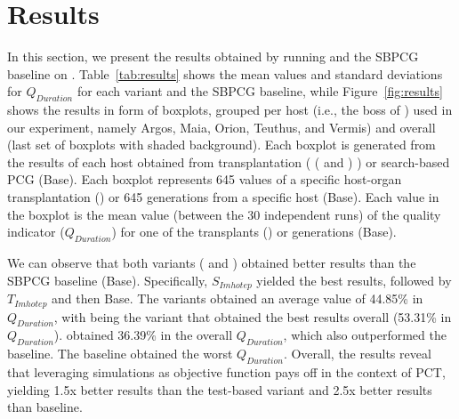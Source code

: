 \section{Results}
\label{sec:Results}

In this section, we present the results obtained by running \ApproachName and the SBPCG baseline on \CaseStudy{}.
Table~\ref{tab:results} shows the mean values and standard deviations for $Q_{Duration}$ for each \ApproachName{} variant and the SBPCG baseline, while Figure~\ref{fig:results} shows the results in form of boxplots, grouped per host (i.e., the boss of \CaseStudy{}) used in our experiment, namely Argos, Maia, Orion, Teuthus, and Vermis) and overall (last set of boxplots with shaded background).  
Each boxplot is generated from the results of each host obtained from transplantation \ApproachName{} ( (\simhotep{} and \timhotep{}) ) or search-based PCG (Base). Each boxplot represents 645 values of a specific host-organ transplantation (\ApproachName{}) or 645 generations from a specific host (Base). Each value in the boxplot is the mean value (between the 30 independent runs) of the quality indicator ($Q_{Duration}$) for one of the transplants (\ApproachName{}) or generations (Base). 

We can observe that both variants (\simhotep{} and \timhotep{}) obtained better results than the SBPCG baseline (Base). Specifically, $S_{Imhotep}$ yielded the best results, followed by $T_{Imhotep}$ and then Base. The variants obtained an average value of 44.85\% in $Q_{Duration}$, with \simhotep{} being the variant that obtained the best results overall (53.31\% in $Q_{Duration}$). \timhotep obtained 36.39\% in the overall $Q_{Duration}$, which also outperformed the baseline. The baseline obtained the worst $Q_{Duration}$. Overall, the results reveal that leveraging simulations as objective function pays off in the context of PCT, yielding 1.5x better results than the test-based variant and 2.5x better results than baseline.


